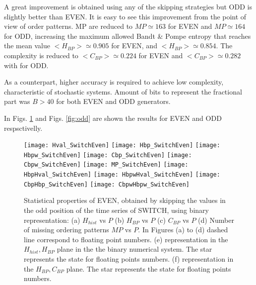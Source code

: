A great improvement is obtained using any of the skipping strategies but ODD is slightly better than EVEN.
It is easy to see this improvement from the point of view of order patterns.
MP are reduced to $MP\simeq 163$ for EVEN and $MP\simeq 164$ for ODD, increasing the maximum allowed Bandt \& Pompe entropy that reaches the mean value $<H_{BP}>\simeq 0.905$ for EVEN, and $<H_{BP}>\simeq 0.854$.
The complexity is reduced to $<C_{BP}>\simeq 0.224$ for EVEN and  $<C_{BP}>\simeq 0.282$ with for ODD.

As a counterpart, higher accuracy is required to achieve low complexity, characteristic of stochastic systems.
Amount of bits to represent the fractional part was $B>40$ for both EVEN and ODD generators.

In Figs. \ref{fig:even} and Figs. \ref{fig:odd} are shown the results for EVEN and ODD respsctivelly.

\begin{figure}
	\texttt{[image: Hval\_SwitchEven]}
	\texttt{[image: Hbp\_SwitchEven]}
	\texttt{[image: Hbpw\_SwitchEven]}
	\texttt{[image: Cbp\_SwitchEven]}
	\texttt{[image: Cbpw\_SwitchEven]}
	\texttt{[image: MP\_SwitchEven]}
	\texttt{[image: HbpHval\_SwitchEven]}
	\texttt{[image: HbpwHval\_SwitchEven]}
	\texttt{[image: CbpHbp\_SwitchEven]}
	\texttt{[image: CbpwHbpw\_SwitchEven]}
	\caption{Statistical properties of EVEN, obtained by skipping the values in the odd position of the time series of  SWITCH,  using binary representation: (a) $H_{hist}$ vs $P$ (b) $H_{BP}$ vs $P$ (c) $C_{BP}$ vs $P$ (d) Number of missing ordering patterns $MP$ vs $P$. In Figures (a) to (d) dashed line correspond to floating point numbers. (e) representation in the $H_{hist},H_{BP}$ plane in the the binary numerical system.  The star represents the state for floating points numbers. (f) representation in the $H_{BP},C_{BP}$ plane.  The star represents the state for floating points numbers.  } \label{fig:even}
\end{figure}


